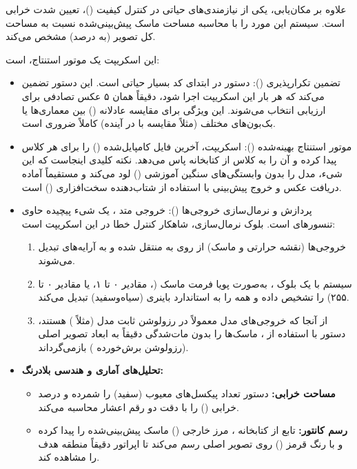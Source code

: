 \documentclass{article}
\begin{document}
علاوه بر مکان‌یابی، یکی از نیازمندی‌های حیاتی در کنترل کیفیت ()، تعیین شدت خرابی است. سیستم این مورد را با محاسبه مساحت ماسک پیش‌بینی‌شده نسبت به مساحت کل تصویر (به درصد) مشخص می‌کند.


این اسکریپت یک موتور استنتاج،  است:

\begin{itemize}
	\item تضمین تکرارپذیری ():
	دستور  در ابتدای کد بسیار حیاتی است. این دستور تضمین می‌کند که هر بار این اسکریپت اجرا شود، دقیقاً همان ۵ عکس تصادفی برای ارزیابی انتخاب می‌شوند. این ویژگی برای مقایسه عادلانه () بین معماری‌ها یا بک‌بون‌های مختلف (مثلاً مقایسه  با  در آینده) کاملاً ضروری است.
	
	\item موتور استنتاج بهینه‌شده ():
	اسکریپت، آخرین فایل کامپایل‌شده  () را برای هر کلاس پیدا کرده و آن را به کلاس  از کتابخانه  پاس می‌دهد. نکته کلیدی اینجاست که این شیء، مدل را بدون وابستگی‌های سنگین آموزشی () لود می‌کند و مستقیماً آماده دریافت عکس و خروج پیش‌بینی با استفاده از شتاب‌دهنده سخت‌افزاری () است.
	
	\item پردازش و نرمال‌سازی خروجی‌ها ():
	خروجی متد ، یک شیء پیچیده حاوی تنسورهای  است. بلوک نرمال‌سازی، شاهکار کنترل خطا در این اسکریپت است:
	\begin{enumerate}
		\item خروجی‌ها (نقشه حرارتی و ماسک) از روی  به  منتقل شده و به آرایه‌های  تبدیل می‌شوند.
		\item سیستم با یک بلوک ، به‌صورت پویا فرمت ماسک (، مقادیر ۰ تا ۱، یا مقادیر ۰ تا ۲۵۵) را تشخیص داده و همه را به استاندارد  باینری (سیاه‌وسفید) تبدیل می‌کند.
		\item از آنجا که خروجی‌های مدل  معمولاً در رزولوشن ثابت مدل (مثلاً ) هستند، دستور  با استفاده از ، ماسک‌ها را بدون مات‌شدگی دقیقاً به ابعاد تصویر اصلی (رزولوشن برش‌خورده ) بازمی‌گرداند.
	\end{enumerate}
	
	\item \textbf{تحلیل‌های آماری و هندسی بلادرنگ:}
	\begin{itemize}
		\item \textbf{مساحت خرابی:} دستور  تعداد پیکسل‌های معیوب (سفید) را شمرده و درصد خرابی () را با دقت دو رقم اعشار محاسبه می‌کند.
		\item \textbf{رسم کانتور:} تابع  از کتابخانه ، مرز خارجی () ماسک پیش‌بینی‌شده را پیدا کرده و با رنگ قرمز (\lr{\texttt{[255, 0, 0]}}) روی تصویر اصلی رسم می‌کند تا اپراتور دقیقاً منطقه هدف را مشاهده کند.
	\end{itemize}
	

\end{itemize}
\end{document}
